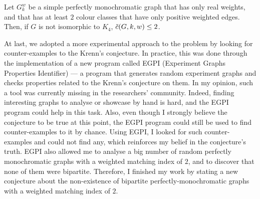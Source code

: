\begin{lemma}
    Let $G_k^w$ be a simple perfectly monochromatic graph that has only real weights, and that has at least $2$ colour classes that have only positive weighted edges.
    Then, if $G$ is not isomorphic to $K_4$, $\Tilde{c}(G, k, w) \leq 2$.
\end{lemma}

At last, we adopted a more experimental approach to the problem by looking for counter-examples to the Krenn's conjecture.
In practice, this was done through the implementation of a new program called EGPI (Experiment Graphs Properties Identifier) — a program that generates random experiment graphs and checks properties related to the Krenn's conjecture on them.
In my opinion, such a tool was currently missing in the researchers' community.
Indeed, finding interesting graphs to analyse or showcase by hand is hard, and the EGPI program could help in this task.
Also, even though I strongly believe the conjecture to be true at this point, the EGPI program could still be used to find counter-examples to it by chance.
Using EGPI, I looked for such counter-examples and could not find any, which reinforces my belief in the conjecture's truth.
EGPI also allowed me to analyse a big number of random perfectly monochromatic graphs with a weighted matching index of $2$, and to discover that none of them were bipartite.
Therefore, I finished my work by stating a new conjecture about the non-existence of bipartite perfectly-monochromatic graphs with a weighted matching index of $2$.\\
